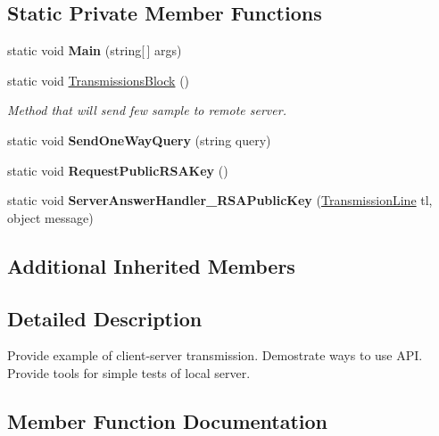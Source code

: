 \subsection*{Static Private Member Functions}
\begin{DoxyCompactItemize}
\item 
\mbox{\label{class_example_clent_1_1_client_a2877623da00a3298a576a2b1d43ffb29}} 
static void {\bfseries Main} (string\mbox{[}$\,$\mbox{]} args)
\item 
static void \mbox{\hyperlink{class_example_clent_1_1_client_a07189f53ed2d609dafbb8a856434c694}{Transmissions\+Block}} ()
\begin{DoxyCompactList}\small\item\em Method that will send few sample to remote server. \end{DoxyCompactList}\item 
\mbox{\label{class_example_clent_1_1_client_a7e95cf09843a81fac2dd5242a1268eee}} 
static void {\bfseries Send\+One\+Way\+Query} (string query)
\item 
\mbox{\label{class_example_clent_1_1_client_a763e285f590ae8a45f0fb4a67183f540}} 
static void {\bfseries Request\+Public\+R\+S\+A\+Key} ()
\item 
\mbox{\label{class_example_clent_1_1_client_ab296f6e87332e4ddcd1145bd63b1ea64}} 
static void {\bfseries Server\+Answer\+Handler\+\_\+\+R\+S\+A\+Public\+Key} (\mbox{\hyperlink{class_pipes_provider_1_1_client_1_1_transmission_line}{Transmission\+Line}} tl, object message)
\end{DoxyCompactItemize}
\subsection*{Additional Inherited Members}


\subsection{Detailed Description}
Provide example of client-\/server transmission. Demostrate ways to use A\+PI. Provide tools for simple tests of local server. 



\subsection{Member Function Documentation}
\mbox{\label{class_example_clent_1_1_client_a07189f53ed2d609dafbb8a856434c694}} 
